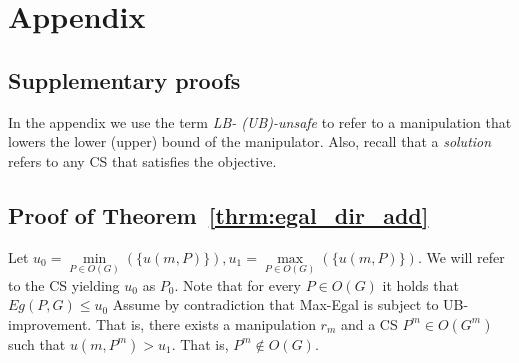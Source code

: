 \pdfpagewidth=8.5in
\pdfpageheight=11in
\usepackage{ijcai21}

\usepackage{times}
\usepackage{soul}
\usepackage{url}
\usepackage[hidelinks]{hyperref}
\usepackage[utf8]{inputenc}
\usepackage[small]{caption}
\usepackage{graphicx}
\usepackage{helvet}
\usepackage{amsthm}
\usepackage{booktabs}
\usepackage{algorithm}
\usepackage{algorithmic}
%
\usepackage{amsmath}
\usepackage{amsthm}
\usepackage{booktabs}
\usepackage{algorithm}
\usepackage{algorithmic}
\usepackage{subcaption}
\usepackage[dvipsnames]{xcolor}
\usepackage{latexsym}
\newcommand{\ra}[1]{\renewcommand{\arraystretch}{#1}}
\newtheorem{theorem}{Theorem}
\newtheorem{proposition}{Proposition}
\newtheorem{conjecture}{Conjecture}
\newtheorem{definition}{Definition}
\newtheorem{lemma}{Lemma}
\def\tuple#1{( #1 )}





\maketitle

\clearpage
\section*{Appendix}




\subsection*{Supplementary proofs}
In the appendix we use the term \emph{LB- (UB)-unsafe} to refer to a manipulation that lowers the lower (upper) bound of the manipulator. Also, recall that a \emph{solution} refers to any CS that satisfies the objective.

\subsection*{Proof of Theorem~\ref{thrm:egal_dir_add}}
Let 
$
u_0=\underset{P\in O(G)}{\min}(\{u(m,P)\}),
u_1=\underset{P\in O(G)}{\max}(\{u(m,P)\})
$.
We will refer to the CS yielding $u_0$ as $P_0$. Note that for every $P\in O(G)$ it holds that $Eg(P,G) \leq u_0 $
Assume by contradiction that Max-Egal is subject to UB-improvement.
That is, there exists a manipulation $r_{m}$ and a CS $P^m\in O(G^{m})$ such that $u(m,P^m) > u_1$. That is, $P^m\notin O(G)$.

